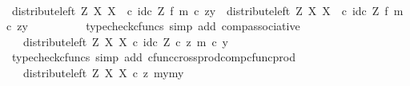 \begin{isabellebody}
\ \ \ \ \isamarkupfalse%
\ {\isacharminus}{\kern0pt}\isanewline
\ \ \ \ \ \ \isamarkupfalse%
\ {\isachardoublequoteopen}{\isacharparenleft}{\kern0pt}distribute{\isacharunderscore}{\kern0pt}left\ Z\ X\ X\ \ {\isasymcirc}\isactrlsub c\ {\isacharparenleft}{\kern0pt}id\isactrlsub c\ Z\ {\isasymtimes}\isactrlsub f\ m{\isacharparenright}{\kern0pt}{\isacharparenright}{\kern0pt}\ {\isasymcirc}\isactrlsub c\ {\isasymlangle}z{\isacharcomma}{\kern0pt}y{\isacharprime}{\kern0pt}{\isasymrangle}\ {\isacharequal}{\kern0pt}\ distribute{\isacharunderscore}{\kern0pt}left\ Z\ X\ X\ \ {\isasymcirc}\isactrlsub c\ {\isacharparenleft}{\kern0pt}id\isactrlsub c\ Z\ {\isasymtimes}\isactrlsub f\ m{\isacharparenright}{\kern0pt}\ {\isasymcirc}\isactrlsub c\ {\isasymlangle}z{\isacharcomma}{\kern0pt}y{\isacharprime}{\kern0pt}{\isasymrangle}{\isachardoublequoteclose}\isanewline
\ \ \ \ \ \ \ \ \isamarkupfalse%
\ {\isacharparenleft}{\kern0pt}typecheck{\isacharunderscore}{\kern0pt}cfuncs{\isacharcomma}{\kern0pt}\ simp\ add{\isacharcolon}{\kern0pt}\ comp{\isacharunderscore}{\kern0pt}associative{}{\isacharparenright}{\kern0pt}\isanewline
\ \ \ \ \ \ \isamarkupfalse%
\ \isamarkupfalse%
\ {\isachardoublequoteopen}{\isachardot}{\kern0pt}{\isachardot}{\kern0pt}{\isachardot}{\kern0pt}\ {\isacharequal}{\kern0pt}\ distribute{\isacharunderscore}{\kern0pt}left\ Z\ X\ X\ {\isasymcirc}\isactrlsub c\ {\isasymlangle}id\isactrlsub c\ Z\ {\isasymcirc}\isactrlsub c\ z{\isacharcomma}{\kern0pt}\ m\ {\isasymcirc}\isactrlsub c\ y{\isacharprime}{\kern0pt}{\isasymrangle}{\isachardoublequoteclose}\isanewline
\ \ \ \ \ \ \ \ \isamarkupfalse%
\ {\isacharparenleft}{\kern0pt}typecheck{\isacharunderscore}{\kern0pt}cfuncs{\isacharcomma}{\kern0pt}\ simp\ add{\isacharcolon}{\kern0pt}\ cfunc{\isacharunderscore}{\kern0pt}cross{\isacharunderscore}{\kern0pt}prod{\isacharunderscore}{\kern0pt}comp{\isacharunderscore}{\kern0pt}cfunc{\isacharunderscore}{\kern0pt}prod{\isacharparenright}{\kern0pt}\isanewline
\ \ \ \ \ \ \isamarkupfalse%
\ \isamarkupfalse%
\ {\isachardoublequoteopen}{\isachardot}{\kern0pt}{\isachardot}{\kern0pt}{\isachardot}{\kern0pt}\ {\isacharequal}{\kern0pt}\ distribute{\isacharunderscore}{\kern0pt}left\ Z\ X\ X\ {\isasymcirc}\isactrlsub c\ {\isasymlangle}z{\isacharcomma}{\kern0pt}\ {\isasymlangle}my{}{\isacharcomma}{\kern0pt}my{}{\isasymrangle}{\isasymrangle}{\isachardoublequoteclose}\isanewline
\ \ \ \ \ \ \ \ \isamarkupfalse%

\end{isabellebody}
